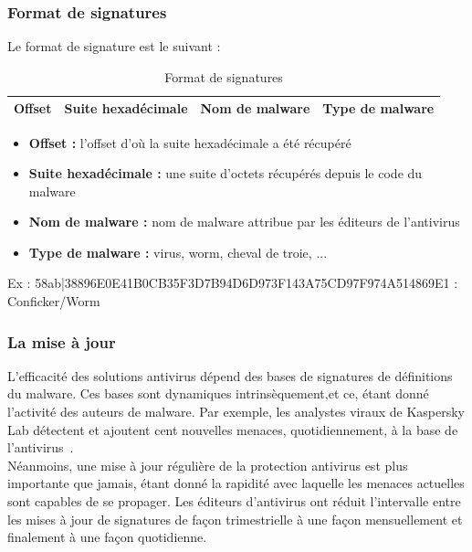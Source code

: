 \subsubsection{Format de signatures}
Le format de signature est le suivant :\\
\begin{table}[H]
\begin{center}
\begin{tabular}{|p{3.5cm}|p{3.5cm}|p{3.5cm}|p{3.5cm}|}
\hline Offset & Suite hexadécimale &  Nom de malware & Type de malware \\
\hline
\end{tabular}
\caption{Format de signatures}
\label{signatures}
\end{center}
\end{table}

\begin{itemize}
\item \textbf{Offset : }l'offset d'où la suite hexadécimale a été récupéré  
\item \textbf{Suite hexadécimale : }une suite d'octets récupérés depuis le code du malware 
\item \textbf{Nom de malware : }nom de malware attribue par les éditeurs de l'antivirus 
\item \textbf{Type de malware : }virus, worm, cheval de troie, ...
\end{itemize} 
Ex : 58ab|38896E0E41B0CB35F3D7B94D6D973F143A75CD97F974A514869E1 : Conficker/Worm

\subsubsection{La mise à jour}
L'efficacité des solutions antivirus dépend des bases de signatures de définitions du malware. Ces bases sont dynamiques intrinsèquement,et ce, étant donné l'activité des auteurs de malware. Par exemple, les analystes viraux de Kaspersky Lab détectent et ajoutent cent nouvelles menaces, quotidiennement, à la base de l'antivirus~\cite{mise}.\\


Néanmoins, une mise à jour régulière de la protection antivirus est plus importante que jamais, étant donné la rapidité avec laquelle les menaces actuelles sont capables de se propager. Les éditeurs d'antivirus ont réduit l'intervalle entre les mises à jour de signatures de façon trimestrielle à une façon mensuellement et finalement à une façon quotidienne.\\


